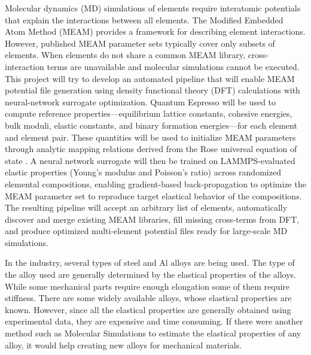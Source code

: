 \documentclass{phys400proposal}
\begin{document}
\makeproposalcover

\newpage

\begin{boxedabstract}
\small
Molecular dynamics (MD) simulations of elements require interatomic potentials that explain the interactions between all elements. The Modified Embedded Atom Method (MEAM) provides a framework for describing element interactions. However, published MEAM parameter sets typically cover only subsets of elements.	 When elements do not share a common MEAM library, cross-interaction terms are unavailable and molecular simulations cannot be executed. This project will try to develop an automated pipeline that will enable MEAM potential file generation using density functional theory (DFT) calculations with neural-network surrogate optimization. Quantum Espresso will be used to compute reference properties---equilibrium lattice constants, cohesive energies, bulk moduli, elastic constants, and binary formation energies---for each element and element pair. These quantities will be used to initialize MEAM parameters through analytic mapping relations derived from the Rose universal equation of state \citep{vinet1989universal}. A neural network surrogate will then be trained on LAMMPS-evaluated elastic properties (Young's modulus and Poisson's ratio) across randomized elemental compositions, enabling gradient-based back-propagation to optimize the MEAM parameter set to reproduce target elastical behavior of the compositions. The resulting pipeline will accept an arbitrary list of elements, automatically discover and merge existing MEAM libraries, fill missing cross-terms from DFT, and produce optimized multi-element potential files ready for large-scale MD simulations.

\vspace{0.5em}
\end{boxedabstract}

\introduction
In the industry, several types of steel and Al alloys are being used. The type of the alloy used are generally determined by the elastical properties of the alloys. While some mechanical parts require enough elongation some of them require stiffness. There are some widely available alloys, whose elastical properties are known. However, since all the elastical properties are generally obtained using experimental data, they are expensive and time consuming. If there were another method such as Molecular Simulations to estimate the elastical properties of any alloy, it would help creating new alloys for mechanical materials.
\end{document}
